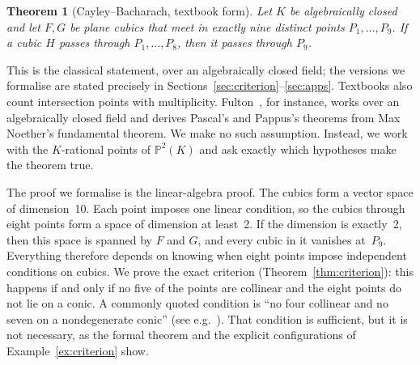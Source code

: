 \documentclass[11pt]{article}
\newtheorem{theorem}{Theorem}
\theoremstyle{definition}
\theoremstyle{remark}
\newcommand{\PP}{\mathbb{P}}
\begin{document}
\begin{theorem}[Cayley--Bacharach, textbook form]\label{thm:textbook}
Let $K$ be algebraically closed and let $F,G$ be plane cubics that meet in exactly nine distinct points $P_1,\dots,P_9$. If a cubic
$H$ passes through $P_1,\dots,P_8$, then it passes through $P_9$.
\end{theorem}

This is the classical statement, over an algebraically closed field; the versions we formalise are
stated precisely in Sections~\ref{sec:criterion}--\ref{sec:apps}. Textbooks also count intersection points with
multiplicity. Fulton~\cite[\S5.6]{Fulton}, for instance, works over an algebraically closed field
and derives Pascal's and Pappus's theorems from Max Noether's fundamental theorem. We make no
such assumption. Instead,
we work with the $K$-rational points of $\PP^2(K)$ and ask exactly which hypotheses make the
theorem true.

The proof we formalise is the linear-algebra proof. The cubics form a vector space of
dimension~10. Each point imposes one linear condition, so the cubics through eight points form a
space of dimension at least~2. If the dimension is exactly~2, then this space is spanned by $F$
and $G$, and every cubic in it vanishes at~$P_9$. Everything therefore depends on knowing when
eight points impose independent conditions on cubics. We prove the exact criterion
(Theorem~\ref{thm:criterion}): this happens if and only if no five of the points are collinear
and the eight points do not lie on a conic. A commonly quoted condition is ``no four collinear
and no seven on a nondegenerate conic'' (see e.g.~\cite{Wikipedia}). That condition is
sufficient, but it is not necessary, as the formal theorem and the explicit configurations of
Example~\ref{ex:criterion} show.
\end{document}
